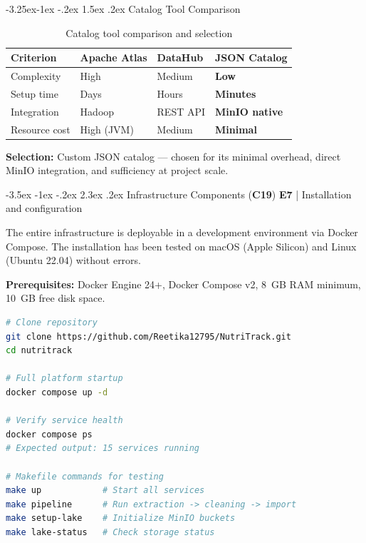 \documentclass[a4paper,11pt,oneside,openany]{report}
\makeatletter
\renewcommand\section{\@startsection{section}{1}{\z@}%
  {-3.5ex \@plus -1ex \@minus -.2ex}%
  {2.3ex \@plus.2ex}%
  {\normalfont\Large\bfseries\color{ntgreen}}}
\renewcommand\subsection{\@startsection{subsection}{2}{\z@}%
  {-3.25ex\@plus -1ex \@minus -.2ex}%
  {1.5ex \@plus .2ex}%
  {\normalfont\large\bfseries\color{ntdarkgreen}}}
\newcommand{\competence}[1]{\textbf{\textcolor{ntgreen}{#1}}}
\newcommand{\evaluation}[1]{\textbf{\textcolor{ntblue}{#1}}}
\makeatother
\begin{document}
\subsection{Catalog Tool Comparison}

\begin{table}[H]
\centering
\caption{Catalog tool comparison and selection}
\label{tab:catalog-compare}
\begin{tabularx}{\textwidth}{L{2.5cm} C{2.5cm} C{2.5cm} C{3.5cm}}
\toprule
\textbf{Criterion} & \textbf{Apache Atlas} & \textbf{DataHub} & \textbf{JSON Catalog} \\
\midrule
Complexity & High & Medium & \textbf{Low} \\
Setup time & Days & Hours & \textbf{Minutes} \\
Integration & Hadoop & REST API & \textbf{MinIO native} \\
Resource cost & High (JVM) & Medium & \textbf{Minimal} \\
\bottomrule
\end{tabularx}
\end{table}

\textbf{Selection:} Custom JSON catalog --- chosen for its minimal
overhead, direct MinIO integration, and sufficiency at project scale.


\section{Infrastructure Components (\competence{C19})}
\label{sec:c19}
{\small\evaluation{E7} | Installation and configuration}

The entire infrastructure is deployable in a development environment
via Docker Compose. The installation has been tested on macOS (Apple Silicon)
and Linux (Ubuntu 22.04) without errors.

\textbf{Prerequisites:} Docker Engine 24+, Docker Compose v2, 8~GB RAM minimum,
10~GB free disk space.

\begin{lstlisting}[language=bash, caption={Infrastructure deployment}]
# Clone repository
git clone https://github.com/Reetika12795/NutriTrack.git
cd nutritrack

# Full platform startup
docker compose up -d

# Verify service health
docker compose ps
# Expected output: 15 services running

# Makefile commands for testing
make up            # Start all services
make pipeline      # Run extraction -> cleaning -> import
make setup-lake    # Initialize MinIO buckets
make lake-status   # Check storage status
\end{lstlisting}
\end{document}
